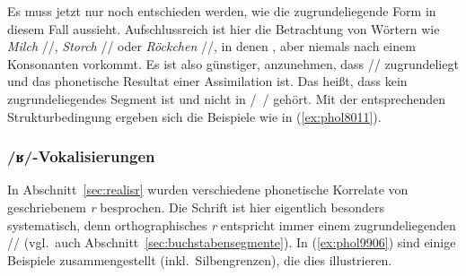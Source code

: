 Es muss jetzt nur noch entschieden werden, wie die zugrundeliegende Form in diesem Fall aussieht.
Aufschlussreich ist hier die Betrachtung von Wörtern wie \textit{Milch} //, \textit{Storch} // oder \textit{Röckchen} //, in denen \textipa{[\c{c}]}, aber niemals \textipa{[X]} nach einem Konsonanten vorkommt.
Es ist also günstiger, anzunehmen, dass // zugrundeliegt und \textipa{[X]} das phonetische Resultat einer Assimilation ist.
Das heißt, dass \textipa{[X]} kein zugrundeliegendes Segment ist und nicht in /~/ gehört.
Mit der entsprechenden Strukturbedingung ergeben sich die Beispiele wie in (\ref{ex:phol8011}).


\begin{exe}
  \ex\label{ex:phol8011}
  \begin{xlist}
  \end{xlist}
\end{exe}

\subsubsection{/ʁ/-Vokalisierungen}

\label{sec:prozrvok}

In Abschnitt~\ref{sec:realisr} wurden verschiedene phonetische Korrelate von geschriebenem \textit{r} besprochen.
Die Schrift ist hier eigentlich besonders systematisch, denn orthographisches \textit{r} entspricht immer einem zugrundeliegenden // (vgl.\ auch Abschnitt~\ref{sec:buchstabensegmente}).
In (\ref{ex:phol9906}) sind einige Beispiele zusammengestellt (inkl.\ Silbengrenzen), die dies illustrieren.

\begin{exe}
  \ex\label{ex:phol9906}
  \begin{xlist}
  \end{xlist}
\end{exe}

